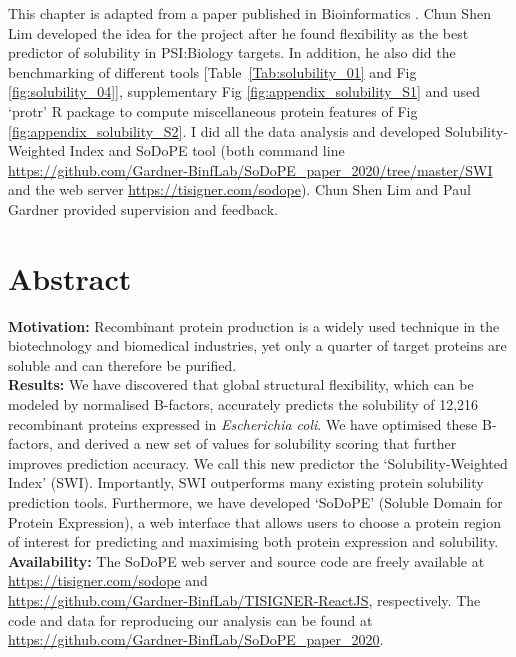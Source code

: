This chapter is adapted from a paper published in Bioinformatics \cite{Bhandari2020-pz}. Chun Shen Lim developed the idea for the project after he found flexibility as the best predictor of solubility in PSI:Biology targets. In addition, he also did the benchmarking of different tools  [Table~\ref{Tab:solubility_01} and Fig \ref{fig:solubility_04}], supplementary Fig \ref{fig:appendix_solubility_S1} and used ‘protr’ R package to compute miscellaneous protein features of Fig \ref{fig:appendix_solubility_S2}. I did all the data analysis and developed Solubility-Weighted Index and SoDoPE tool (both command line \href{https://github.com/Gardner-BinfLab/SoDoPE\_paper\_2020/tree/master/SWI}{https://github.com/Gardner-BinfLab/SoDoPE\_paper\_2020/tree/master/SWI} and the web server \href{https://tisigner.com/sodope}{https://tisigner.com/sodope}). Chun Shen Lim and Paul Gardner provided supervision and feedback.


\section{Abstract}
\textbf{Motivation:} Recombinant protein production is a widely used technique in the biotechnology and biomedical industries, yet only a quarter of target proteins are soluble and can therefore be purified.\\
\textbf{Results:} We have discovered that global structural flexibility, which can be modeled by normalised B-factors, accurately predicts the solubility of 12,216 recombinant proteins expressed in \textit{Escherichia coli}. We have optimised these B-factors, and derived a new set of values for solubility scoring that further improves prediction accuracy. We call this new predictor the ‘Solubility-Weighted Index’ (SWI). Importantly, SWI outperforms many existing protein solubility prediction tools. Furthermore, we have developed ‘SoDoPE’ (Soluble Domain for Protein Expression), a web interface that allows users to choose a protein region of interest for predicting and maximising both protein expression and solubility.\\
\textbf{Availability:} The SoDoPE web server and source code are freely available at\\ \href{https://tisigner.com/sodope}{https://tisigner.com/sodope} and \\ \href{https://github.com/Gardner-BinfLab/TISIGNER-ReactJS}{https://github.com/Gardner-BinfLab/TISIGNER-ReactJS}, respectively.
The code and data for reproducing our analysis can be found at\\ \href{https://github.com/Gardner-BinfLab/SoDoPE\_paper\_2020}{https://github.com/Gardner-BinfLab/SoDoPE\_paper\_2020}.\\



